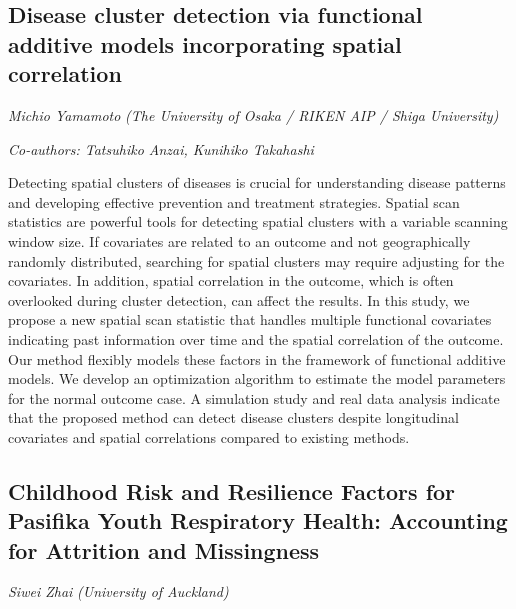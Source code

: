 \documentclass[
]{scrreprt}
\begin{document}
\subsection{Disease cluster detection via functional additive models
incorporating spatial
correlation}\label{disease-cluster-detection-via-functional-additive-models-incorporating-spatial-correlation}

\emph{Michio Yamamoto} \emph{(The University of
Osaka / RIKEN AIP / Shiga University)}

\emph{Co-authors: Tatsuhiko Anzai, Kunihiko Takahashi}

\setlength{\parskip}{0.5em}

Detecting spatial clusters of diseases is crucial for understanding
disease patterns and developing effective prevention and treatment
strategies. Spatial scan statistics are powerful tools for detecting
spatial clusters with a variable scanning window size. If covariates are
related to an outcome and not geographically randomly distributed,
searching for spatial clusters may require adjusting for the covariates.
In addition, spatial correlation in the outcome, which is often
overlooked during cluster detection, can affect the results. In this
study, we propose a new spatial scan statistic that handles multiple
functional covariates indicating past information over time and the
spatial correlation of the outcome. Our method flexibly models these
factors in the framework of functional additive models. We develop an
optimization algorithm to estimate the model parameters for the normal
outcome case. A simulation study and real data analysis indicate that
the proposed method can detect disease clusters despite longitudinal
covariates and spatial correlations compared to existing methods.

\subsection{Childhood Risk and Resilience Factors for Pasifika Youth
Respiratory Health: Accounting for Attrition and
Missingness}\label{childhood-risk-and-resilience-factors-for-pasifika-youth-respiratory-health-accounting-for-attrition-and-missingness}

\emph{Siwei Zhai} \emph{(University of Auckland)}

\setlength{\parskip}{0.5em}
\end{document}
